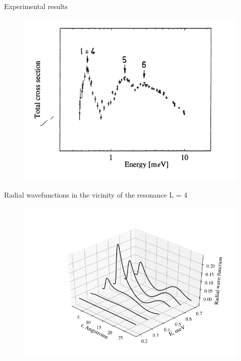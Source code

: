 \documentclass[10pt,pdf,hyperref={unicode}]{beamer}
\begin{document}
\begin{frame}{Experimental results}
	\vspace*{-0.2cm}
	\begin{figure}
		\includegraphics[scale=0.4]{../numerov_LJ/pictures/experiment.png}
	\end{figure}
\end{frame}

\begin{frame}{Radial wavefunctions in the vicinity of the resonance L = 4}
	\vspace*{-1.3cm}
	\begin{figure}
		\hspace*{-2.5cm}
		\includegraphics[scale=0.5]{../numerov_LJ/pictures/l_4_wavefunctions.png}
	\end{figure}
\end{frame}
\end{document}
